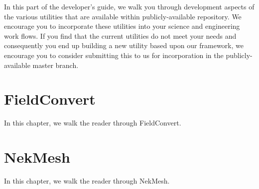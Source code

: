 
In this part of the developer's guide, we walk you through development aspects of the various utilities that are available within publicly-available \nek repository.
We encourage you to incorporate these utilities into your science and engineering work flows.  If you find that the current utilities do not meet your needs and consequently you end up building
a new utility based upon our framework, we encourage you to consider submitting this to us for incorporation in the publicly-available master branch.


\chapter{FieldConvert}

In this chapter, we walk the reader through FieldConvert.



\chapter{NekMesh}

In this chapter, we walk the reader through NekMesh.


